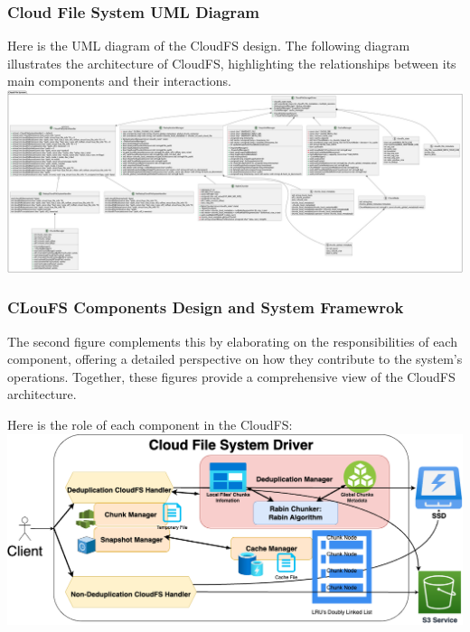 \documentclass[10pt]{article}
\begin{document}
\vspace{-0.05cm}
\newpage

\subsubsection*{Cloud File System UML Diagram}
Here is the UML diagram of the CloudFS design.  The following diagram illustrates the architecture of CloudFS, highlighting the relationships between its main components and their interactions. \\

\includegraphics*[width=\textwidth]{./out/CloudFS_UML/CloudFS_UML.png}
% 

\subsubsection*{CLouFS Components Design and System Framewrok}
The second figure complements this by elaborating on the responsibilities of each component, offering a detailed perspective on how they contribute to the system's operations. Together, these figures provide a comprehensive view of the CloudFS architecture.

Here is the role of each component in the CloudFS: \\

\includegraphics*[width=\textwidth]{./out/System.png}

\newpage
\vspace{0.6em}
\end{document}
